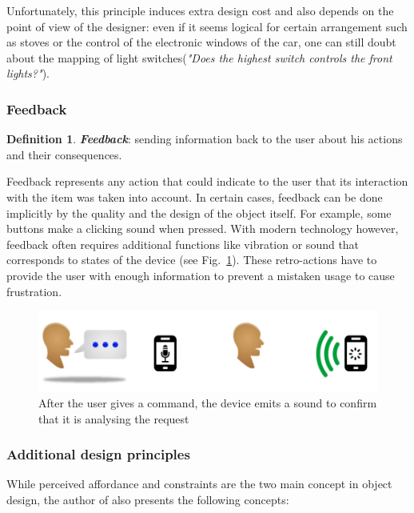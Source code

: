 \documentclass[a4paper,11pt] {article}
\theoremstyle{definition}
\newtheorem{defn}{Definition}[section]
\begin{document}
Unfortunately, this principle induces extra design cost and also depends on the point of view of the designer: even if it seems logical for certain arrangement such as stoves or the control of the electronic windows of the car, one can still doubt about the mapping of light switches(\textit{"Does the highest switch controls the front lights?"}).

    \subsubsection{Feedback}
\begin{defn}
\textit{\textbf{Feedback}}: sending information back to the user about his actions and their consequences.
\cite{Norman02}
\end{defn}

Feedback represents any action that could indicate to the user that its interaction with the item was taken into account. In certain cases, feedback can be done implicitly by the quality and the design of the object itself. For example, some buttons make a clicking sound when pressed. With modern technology however, feedback often requires additional functions like vibration or sound that corresponds to states of the device (see Fig.~\ref{fig:feedback}). These retro-actions have to provide the user with enough information to prevent a mistaken usage to cause frustration.

\begin{figure}[h]
\centering
\includegraphics[scale=0.5]{fig-report/retro-action-speaking.jpg}
\caption{After the user gives a command, the device emits a sound to confirm that it is analysing the request}
\label{fig:feedback}
\end{figure}

    \subsubsection{Additional design principles}

While perceived affordance and constraints are the two main concept in object design, the author of \cite{Norman02} also presents the following concepts:
\end{document}

